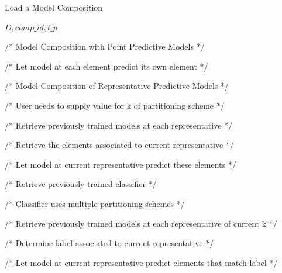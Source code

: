 \begin{algorithm}[h!]
\caption{Load a Model Composition}\label{alg:modelcomp_update}
\begin{algorithmic}[1] 
 {$D, comp\_id, t\_p$}


/* Model Composition with Point Predictive Models */

    
    /* Let model at each element predict its own element */
    
\EndIf

/* Model Composition of Representative Predictive Models */

    /* User needs to supply value for k of partitioning scheme */
    
    /* Retrieve previously trained models at each representative */
    
    
        /* Retrieve the elements associated to current representative */
        
        /* Let model at current representative predict these elements */
    \EndFor

\EndIf


    /* Retrieve previously trained classifier */
    
    /* Classifier uses multiple partitioning schemes */
    
        /* Retrieve previously trained models at each representative of current k */

        
            /* Determine label associated to current representative */
            
            /* Let model at current representative predict elements that match label */
        \EndFor

    \EndFor
\EndIf

\EndFunction 
\end{algorithmic} 
\end{algorithm}

